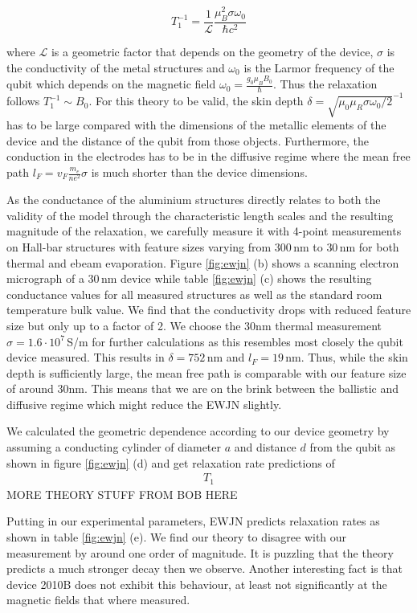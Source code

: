 \documentclass[%
 reprint,
 amsmath,amssymb,
 aps,
]{revtex4-1}
\begin{document}
\begin{equation}
T_1^{-1}=\frac{1}{\mathcal{L}}\frac{\mu_B^2\sigma\omega_0}{\hbar c^2}
\end{equation}

where $\mathcal{L}$ is a geometric factor that depends on the geometry of the device, $\sigma$ is the conductivity of the metal structures and $\omega_0$ is the Larmor frequency of the qubit which depends on the magnetic field $\omega_0=\frac{g_0\mu_B B_0}{\hbar}$.  Thus the relaxation follows $T_1^{-1}\sim B_0$. For this theory to be valid, the skin depth $\delta=\sqrt{\mu_0\mu_R\sigma\omega_0/2}^{-1}$ has to be large compared with the dimensions of the metallic elements of the device and the distance of the qubit from those objects. Furthermore, the conduction in the electrodes has to be in the diffusive regime where the mean free path $l_F=v_F\frac{m_e}{ne^2}\sigma$ is much shorter than the device dimensions.  

As the conductance of the aluminium structures directly relates to both the validity of the model through the characteristic length scales and the resulting magnitude of the relaxation, we carefully measure it with 4-point measurements on Hall-bar structures with feature sizes varying from $300\,$nm to $30\,$nm for both thermal and ebeam evaporation. Figure \ref{fig:ewjn} (b) shows a scanning electron micrograph of a $30\,$nm device while table \ref{fig:ewjn} (c) shows the resulting conductance values for all measured structures as well as the standard room temperature bulk value. 
We find that the conductivity drops with reduced feature size but only up to a factor of 2. We choose the 30nm thermal measurement $\sigma=1.6\cdot 10^7\,$S/m for further calculations as this resembles most closely the qubit device measured. This results in $\delta=752\,$nm and $l_F=19\,$nm. Thus, while the skin depth is sufficiently large, the mean free path is comparable with our feature size of around 30nm. This means that we are on the brink between the ballistic and diffusive regime which might reduce the EWJN slightly.

We calculated the geometric dependence according to our device geometry by assuming a conducting cylinder of diameter $a$ and distance $d$ from the qubit as shown in figure \ref{fig:ewjn} (d) and get relaxation rate predictions of 
\begin{eqnarray}
T_1 
\end{eqnarray} 
MORE THEORY STUFF FROM BOB HERE

Putting in our experimental parameters, EWJN predicts relaxation rates as shown in table \ref{fig:ewjn} (e). We find our theory to disagree with our measurement by around one order of magnitude. It is puzzling that the theory predicts a much stronger decay then we observe. 
Another interesting fact is that device 2010B does not exhibit this behaviour, at least not significantly at the magnetic fields that where measured. 
\end{document}
